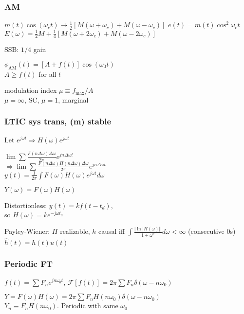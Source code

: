 \documentclass[4pt]{article}
\theoremstyle{definition}
\theoremstyle{definition}
\renewcommand{\o}{\omega}
\newcommand{\ra}{\rightarrow}
\begin{document}
\subsubsection{AM}
    \(m(t) \cos(\o_c t) \ra \frac{1}{2}[M(\o + \o_c) + M(\o - \o_c)]\)     %
    \(e(t) = m(t)\cos^2 \o_c t\)  \\          %
    \(E(\o) = \frac{1}{2} M + \frac{1}{4}[M(\o + 2\o_c) + M(\o - 2\o_c)]\)

    SSB: $1/4$ gain

    \(\phi_\mathrm{AM} (t) = [A + f(t)] \cos (\omega_0 t)\)\\
    $A \geq f(t)$ for all $t$

    modulation index \(\mu\equiv f_{\text{max}}/A\)\\
    $\mu = \infty$, SC, $\mu = 1$, marginal
\subsubsection{LTIC sys trans, (m) stable}
    Let \(e^{j\o t} \Rightarrow H(\o) e^{j\o t}\)

    \(\lim\sum \frac{F(n\Delta\o)\Delta\o}{2\pi} e^{jn\Delta\o t}\)\\
    \(\Rightarrow \lim\sum \frac{F(n\Delta\o)H(n\Delta\o)\Delta\o}{2\pi} e^{jn\Delta\o t}\)\\
    \(y(t) = \frac{1}{2\pi}\int F(\o)H(\o)e^{j\o t} d\o\)

    \(Y(\o) = F(\o) H(\o)\)

    Distortionless: $y(t) = kf(t-t_d)$,\\
    so $H(\o) = ke^{-j\o t_d}$          %

    Payley-Wiener: $H$ realizable, $h$ causal iff \(\int\frac{|\ln|H(\omega)||}{1+\o^2} d\o < \infty\) (consecutive 0s)\\
    \(\hat{h}(t) = h(t) u(t)\)

\subsubsection{Periodic FT}
    \(f(t) = \sum F_n e^{jn\o_0 t}\), \(\mathcal{F}[f(t)] = 2\pi \sum F_n \delta(\omega - n\o_0)\)      %

    \(Y = F(\omega)H(\omega) = 2\pi \sum F_n H(n\omega_0) \delta(\omega - n\omega_0) \) \\            %
    $Y_n \equiv F_n H(n\o_0)$. Periodic with same $\omega_0$
\end{document}
